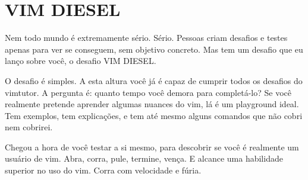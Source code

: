 
\section{VIM DIESEL}
Nem todo mundo é extremamente sério. Sério.
Pessoas criam desafios e testes apenas para ver se conseguem, sem objetivo concreto.
Mas tem um desafio que eu lanço sobre você, o desafio VIM DIESEL.

O desafio é simples. A esta altura você já é capaz de cumprir todos os desafios do vimtutor.
A pergunta é: quanto tempo você demora para completá-lo?
Se você realmente pretende aprender algumas nuances do vim, lá é um playground ideal.
Tem exemplos, tem explicações, e tem até mesmo alguns comandos que não cobri nem cobrirei.

Chegou a hora de você testar a si mesmo, para descobrir se você é realmente um usuário de vim.
Abra, corra, pule, termine, vença.
E alcance uma habilidade superior no uso do vim.
Corra com velocidade e fúria.

\newpage
